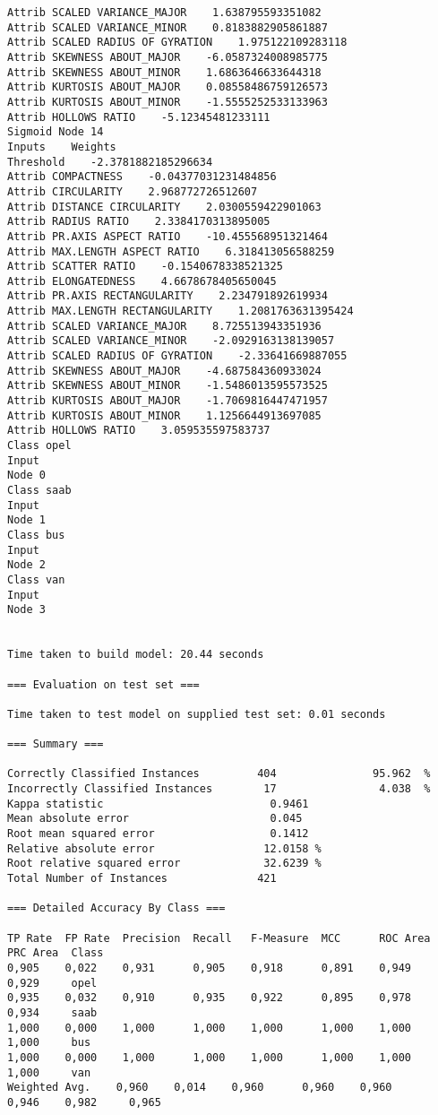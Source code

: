 \documentclass[
	article,			%
	11pt,				%
	oneside,			%
	a4paper,			%
	english,			%
	brazil,				%
	sumario=tradicional
	]{abntex2}
\begin{document}
\begin{lstlisting}
Attrib SCALED VARIANCE_MAJOR    1.638795593351082
Attrib SCALED VARIANCE_MINOR    0.8183882905861887
Attrib SCALED RADIUS OF GYRATION    1.975122109283118
Attrib SKEWNESS ABOUT_MAJOR    -6.0587324008985775
Attrib SKEWNESS ABOUT_MINOR    1.6863646633644318
Attrib KURTOSIS ABOUT_MAJOR    0.08558486759126573
Attrib KURTOSIS ABOUT_MINOR    -1.5555252533133963
Attrib HOLLOWS RATIO    -5.12345481233111
Sigmoid Node 14
Inputs    Weights
Threshold    -2.3781882185296634
Attrib COMPACTNESS    -0.04377031231484856
Attrib CIRCULARITY    2.968772726512607
Attrib DISTANCE CIRCULARITY    2.0300559422901063
Attrib RADIUS RATIO    2.3384170313895005
Attrib PR.AXIS ASPECT RATIO    -10.455568951321464
Attrib MAX.LENGTH ASPECT RATIO    6.318413056588259
Attrib SCATTER RATIO    -0.1540678338521325
Attrib ELONGATEDNESS    4.6678678405650045
Attrib PR.AXIS RECTANGULARITY    2.234791892619934
Attrib MAX.LENGTH RECTANGULARITY    1.2081763631395424
Attrib SCALED VARIANCE_MAJOR    8.725513943351936
Attrib SCALED VARIANCE_MINOR    -2.0929163138139057
Attrib SCALED RADIUS OF GYRATION    -2.33641669887055
Attrib SKEWNESS ABOUT_MAJOR    -4.687584360933024
Attrib SKEWNESS ABOUT_MINOR    -1.5486013595573525
Attrib KURTOSIS ABOUT_MAJOR    -1.7069816447471957
Attrib KURTOSIS ABOUT_MINOR    1.1256644913697085
Attrib HOLLOWS RATIO    3.059535597583737
Class opel
Input
Node 0
Class saab
Input
Node 1
Class bus
Input
Node 2
Class van
Input
Node 3


Time taken to build model: 20.44 seconds

=== Evaluation on test set ===

Time taken to test model on supplied test set: 0.01 seconds

=== Summary ===

Correctly Classified Instances         404               95.962  %
Incorrectly Classified Instances        17                4.038  %
Kappa statistic                          0.9461
Mean absolute error                      0.045 
Root mean squared error                  0.1412
Relative absolute error                 12.0158 %
Root relative squared error             32.6239 %
Total Number of Instances              421     

=== Detailed Accuracy By Class ===

TP Rate  FP Rate  Precision  Recall   F-Measure  MCC      ROC Area  PRC Area  Class
0,905    0,022    0,931      0,905    0,918      0,891    0,949     0,929     opel
0,935    0,032    0,910      0,935    0,922      0,895    0,978     0,934     saab
1,000    0,000    1,000      1,000    1,000      1,000    1,000     1,000     bus
1,000    0,000    1,000      1,000    1,000      1,000    1,000     1,000     van
Weighted Avg.    0,960    0,014    0,960      0,960    0,960      0,946    0,982     0,965     


\end{lstlisting}
\end{document}

